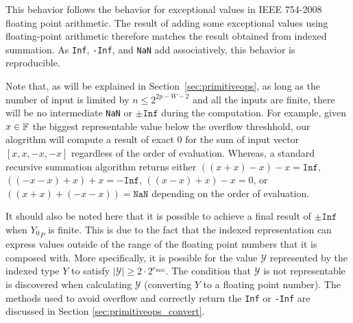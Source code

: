       This behavior follows the behavior for exceptional values in IEEE
      754-2008 floating point arithmetic. The result of adding some exceptional
      values using floating-point arithmetic therefore matches the result
      obtained from indexed summation. As \texttt{Inf}, \texttt{-Inf}, and
      \texttt{NaN} add associatively, this behavior is reproducible.

      Note that, as will be explained in Section~\ref{sec:primitiveops},
      as long as the number of input is limited by $n \leq 2^{2p-W-2}$
      and all the inputs are finite, there will be no intermediate \texttt{NaN}
      or $\pm \texttt{Inf}$ during the computation.
      For example, given $x \in \mathbb{F}$ the biggest representable value below the
      overflow threshhold, our alogrithm will compute a result of exact $0$ for
      the sum of input vector $[x,x,-x,-x]$ regardless of the order of evaluation.
      Whereas, a standard recursive summation algorithm returns either
      $((x+x)-x)-x=\texttt{Inf}$, $((-x-x)+x)+x=-\texttt{Inf}$, $((x-x)+x)-x = 0$, 
      or $((x + x) + (-x-x)) = \texttt{NaN}$ depending on the order of evaluation.

      It should also be noted here that it is possible to achieve a final result of
      $\pm \texttt{Inf}$ when ${Y_0}_P$ is finite. This is due to
      the fact that the indexed representation can express values outside of
      the range of the floating point numbers that it is composed with. More
      specifically, it is possible for the value $\mathcal{Y}$ represented by
      the indexed type $Y$ to satisfy $|\mathcal{Y}| \geq 2 \cdot
      2^{e_{\max}}$. The condition that $\mathcal{Y}$ is not representable is
      discovered when calculating $\mathcal{Y}$ (converting $Y$ to a floating
      point number). The methods used to avoid overflow and correctly return
      the \texttt{Inf} or \texttt{-Inf} are discussed in Section
      \ref{sec:primitiveops_convert}.

